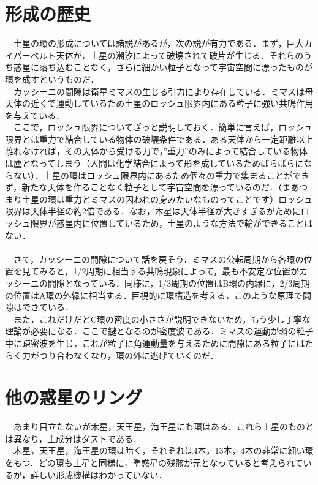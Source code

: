 \documentclass[../main]{subfiles}
\begin{document}
\section{形成の歴史}
　土星の環の形成については諸説があるが，次の説が有力である．まず，巨大カイパーベルト天体が，土星の潮汐によって破壊されて破片が生じる．それらのうち惑星に落ち込むことなく，さらに細かい粒子となって宇宙空間に漂ったものが環を成すというものだ．\\
　カッシーニの間隙は衛星ミマスの生じる引力により存在している．ミマスは母天体の近くで運動しているため土星のロッシュ限界内にある粒子に強い共鳴作用を与えている．\\
　ここで，ロッシュ限界についてざっと説明しておく．簡単に言えば，ロッシュ限界とは重力で結合している物体の破壊条件である．ある天体から一定距離以上離れなければ，その天体から受ける力で，”重力”のみによって結合している物体は塵となってしまう（人間は化学結合によって形を成しているためばらばらにならない）．土星の環はロッシュ限界内にあるため個々の重力で集まることができず，新たな天体を作ることなく粒子として宇宙空間を漂っているのだ．（まあつまり土星の環は重力とミマスの囚われの身みたいなものってことです）ロッシュ限界は天体半径の約2倍である．なお，木星は天体半径が大きすぎるがためにロッシュ限界が惑星内に位置しているため，土星のような方法で輪ができることはない．
\\\\
　さて，カッシーニの間隙について話を戻そう．ミマスの公転周期から各環の位置を見てみると，1/2周期に相当する共鳴現象によって，最も不安定な位置がカッシーニの間隙となっている．同様に，1/3周期の位置はB環の内縁に，2/3周期の位置はA環の外縁に相当する．巨視的に環構造を考える，このような原理で間隙はできている．\\
　また，これだけだとC環の密度の小ささが説明できないため，もう少し丁寧な理論が必要になる．ここで鍵となるのが密度波である．ミマスの運動が環の粒子中に疎密波を生じ，これが粒子に角運動量を与えるために間隙にある粒子にはたらく力がつり合わなくなり，環の外に逃げていくのだ．


\section{他の惑星のリング}
　あまり目立たないが木星，天王星，海王星にも環はある．これら土星のものとは異なり，主成分はダストである．\\
　木星，天王星，海王星の環は暗く，それぞれは4本，13本，4本の非常に細い環をもつ．どの環も土星と同様に，準惑星の残骸が元となっていると考えられているが，詳しい形成機構はわかっていない．
\end{document}
